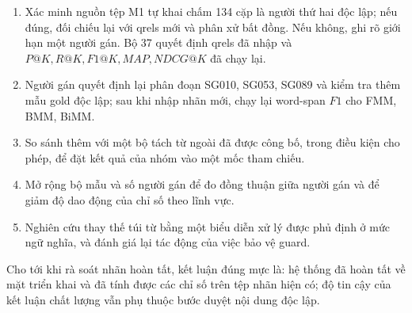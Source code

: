 \begin{enumerate}
  \item Xác minh nguồn tệp M1 tự khai chấm 134 cặp là người thứ hai độc lập;
        nếu đúng, đối chiếu lại với qrels mới và phân xử bất đồng. Nếu không,
        ghi rõ giới hạn một người gán. Bộ 37 quyết định qrels đã nhập và
        $P@K, R@K, F1@K, MAP, NDCG@K$ đã chạy lại.
  \item Người gán quyết định lại phân đoạn SG010, SG053, SG089 và kiểm tra thêm
        mẫu gold độc lập; sau khi nhập nhãn mới, chạy lại word-span $F1$ cho
        FMM, BMM, BiMM.
  \item So sánh thêm với một bộ tách từ ngoài đã được công bố, trong điều kiện cho
        phép, để đặt kết quả của nhóm vào một mốc tham chiếu.
  \item Mở rộng bộ mẫu và số người gán để đo đồng thuận giữa người gán và để giảm
        độ dao động của chỉ số theo lĩnh vực.
  \item Nghiên cứu thay thế túi từ bằng một biểu diễn xử lý được phủ định ở mức
        ngữ nghĩa, và đánh giá lại tác động của việc bảo vệ guard.
\end{enumerate}

Cho tới khi rà soát nhãn hoàn tất, kết luận đúng mực là: hệ thống đã hoàn tất
về mặt triển khai và đã tính được các chỉ số trên tệp nhãn hiện có; độ tin cậy
của kết luận chất lượng vẫn phụ thuộc bước duyệt nội dung độc lập.
